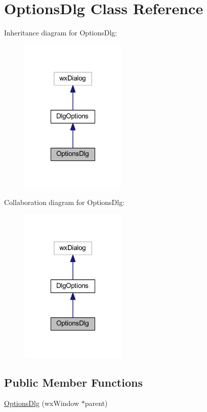 \hypertarget{class_options_dlg}{\section{Options\-Dlg Class Reference}
\label{class_options_dlg}
}


Inheritance diagram for Options\-Dlg\-:\nopagebreak
\begin{figure}[H]
\begin{center}
\leavevmode
\includegraphics[width=144pt]{class_options_dlg__inherit__graph}
\end{center}
\end{figure}


Collaboration diagram for Options\-Dlg\-:\nopagebreak
\begin{figure}[H]
\begin{center}
\leavevmode
\includegraphics[width=144pt]{class_options_dlg__coll__graph}
\end{center}
\end{figure}
\subsection*{Public Member Functions}
\begin{DoxyCompactItemize}
\item 
\hyperlink{class_options_dlg_a40a392346d152d4b9e37e54bcf2cb40a}{Options\-Dlg} (wx\-Window $\ast$parent)
\end{DoxyCompactItemize}
